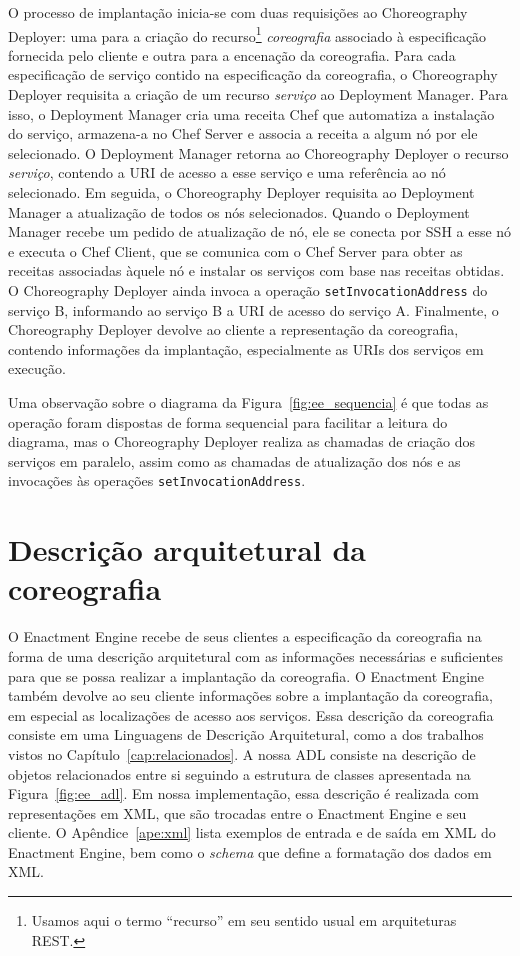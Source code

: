O processo de implantação inicia-se com duas requisições ao Choreography Deployer: uma para a criação do recurso\footnote{Usamos aqui o termo ``recurso'' em seu sentido usual em arquiteturas REST.} \emph{coreografia} associado à especificação fornecida pelo cliente e outra para a encenação da coreografia. Para cada especificação de serviço contido na especificação da coreografia, o Choreography Deployer requisita a criação de um recurso \emph{serviço} ao Deployment Manager. Para isso, o Deployment Manager cria uma receita Chef que automatiza a instalação do serviço, armazena-a no Chef Server e associa a receita a algum nó por ele selecionado. O Deployment Manager retorna ao Choreography Deployer o recurso \emph{serviço}, contendo a URI de acesso a esse serviço e uma referência ao nó selecionado. Em seguida, o Choreography Deployer requisita ao Deployment Manager a atualização de todos os nós selecionados. Quando o Deployment Manager recebe um pedido de atualização de nó, ele se conecta por SSH a esse nó e executa o Chef Client, que se comunica com o Chef Server para obter as receitas associadas àquele nó e instalar os serviços com base nas receitas obtidas. O Choreography Deployer ainda invoca a operação \texttt{setInvocationAddress} do serviço B, informando ao serviço B a URI de acesso do serviço A. Finalmente, o Choreography Deployer devolve ao cliente a representação da coreografia, contendo informações da implantação, especialmente as URIs dos serviços em execução.

Uma observação sobre o diagrama da Figura~\ref{fig:ee_sequencia} é que todas as operação foram dispostas de forma sequencial para facilitar a leitura do diagrama, mas o Choreography Deployer realiza as chamadas de criação dos serviços em paralelo, assim como as chamadas de atualização dos nós e as invocações às operações \texttt{setInvocationAddress}.

\section{Descrição arquitetural da coreografia}
\label{sec:adl}

O Enactment Engine recebe de seus clientes a especificação da coreografia na forma de uma descrição arquitetural com as informações necessárias e suficientes para que se possa realizar a implantação da coreografia. O Enactment Engine também devolve ao seu cliente informações sobre a implantação da coreografia, em especial as localizações de acesso aos serviços. Essa descrição da coreografia consiste em uma Linguagens de Descrição Arquitetural, como a dos trabalhos vistos no Capítulo~\ref{cap:relacionados}. A nossa ADL consiste na descrição de objetos relacionados entre si seguindo a estrutura de classes apresentada na Figura~\ref{fig:ee_adl}. Em nossa implementação, essa descrição é realizada com representações em XML, que são trocadas entre o Enactment Engine e seu cliente. O Apêndice~\ref{ape:xml} lista exemplos de entrada e de saída em XML do Enactment Engine, bem como o \emph{schema} que define a formatação dos dados em XML.  

